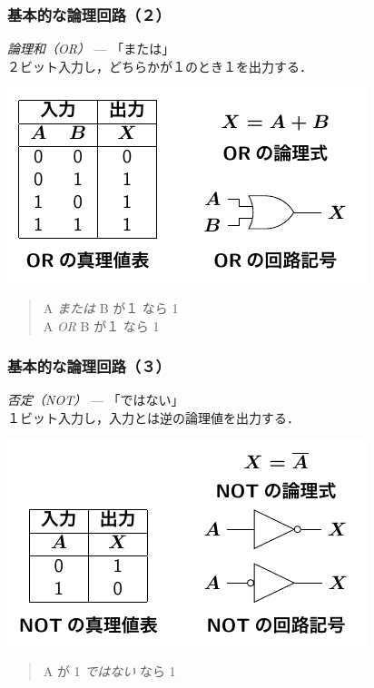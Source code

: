\documentclass[handout]{beamer}        %
\begin{document}
\begin{frame}
  \frametitle{基本的な論理回路（２）}
  \emph{論理和（OR）} --- 「または」\\
  \vfill
  ２ビット入力し，どちらかが１のとき１を出力する．
  \centerline{\includegraphics[scale=1.4]{../Tikz/or.pdf}}
  \begin{quote}
    A \emph{または} B が１ なら 1\\
    A \emph{OR} B が１ なら 1
  \end{quote}
  \vfill
\end{frame}

\begin{frame}
  \frametitle{基本的な論理回路（３）}
  \emph{否定（NOT）} --- 「ではない」\\
  \vfill
  １ビット入力し，入力とは逆の論理値を出力する．
  \centerline{\includegraphics[scale=1.4]{../Tikz/not.pdf}}
  \begin{quote}
    A が 1 \emph{ではない} なら 1\\
  \end{quote}
  \vfill
\end{frame}
\end{document}
